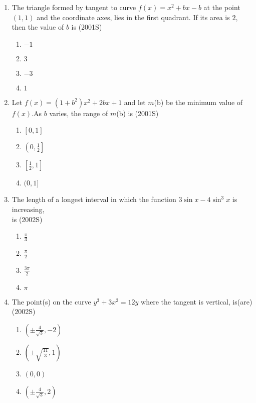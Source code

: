 \documentclass[journal,12pt,twocolumn]{IEEEtran}
\theoremstyle{remark}
\begin{document}
\begin{enumerate}
\item The triangle formed by tangent to curve $f(x)=x^2+bx-b$ at the point $(1,1)$ and the coordinate axes, lies in the first quadrant. If its area is $2$, then the value of $b$ is 
\hfill {(2001S)}
\begin{enumerate}
    \item $-1$
    \item $3$ 
    \item $-3$
    \item $1$\\
\end{enumerate}
\item Let $f(x)=(1+b^2)x^2+2bx+1$ and let $m$(b) be the minimum value of $f(x)$.As $b$ varies, the range of $m$(b) is 
\hfill {(2001S)}
\begin{enumerate}
    \item $[0,1]$\\
    \item $\left(0,\displaystyle\frac{1}{2}\right]$\\
    \item $\left[\displaystyle\frac{1}{2},1\right]$\\
    \item $(0,1]$\\
\end{enumerate}
\item The length of a longest interval in which the function $3 \sin x-4\sin^3x$ is increasing,\\
is \hfill {(2002S)}
\begin{enumerate}
    \item $\displaystyle\frac{\pi}{3}$\\
    \item $\displaystyle\frac{\pi}{2}$\\
    \item $\displaystyle\frac{3\pi}{2}$\\
    \item $\pi$
\end{enumerate}
\item The point(s) on the curve $y^3+3x^2=12y$ where the tangent is vertical, is(are)
\hfill {(2002S)}\\
\begin{enumerate}
    \item $\left(\pm \displaystyle\frac{4}{\sqrt{3}},-2\right)$\\
    \item $\left(\pm\sqrt{\displaystyle\frac{11}{3}},1\right)$\\
    \item $(0,0)$\\
    \item $\left(\pm \displaystyle\frac{4}{\sqrt{3}},2\right)$\\\\
\end{enumerate}


\end{enumerate}
\end{document}
